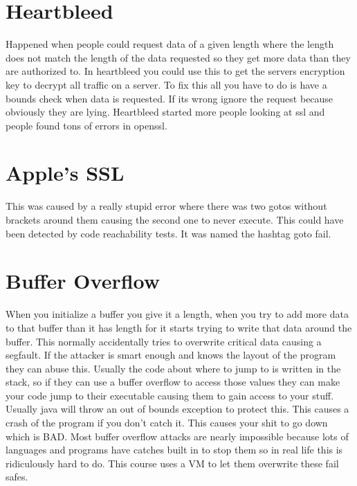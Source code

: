 \documentclass{article}
\begin{document}


\section{Heartbleed} %
\label{sec:heartbleed}
Happened when people could request data of a given length where the length does not match the length of the data requested so they get more data than they are authorized to. In heartbleed you could use this to get the servers encryption key to decrypt all traffic on a server. To fix this all you have to do is have a bounds check when data is requested. If its wrong ignore the request because obviously they are lying. Heartbleed started more people looking at ssl and people found tons of errors in openssl. 


\section{Apple's SSL} %
\label{sec:apple_s_ssl}
This was caused by a really stupid error where there was two gotos without brackets around them causing the second one to never execute. This could have been detected by code reachability tests. It was named the hashtag goto fail. 


\section{Buffer Overflow} %
\label{sec:buffer_overflow}
When you initialize a buffer you give it a length, when you try to add more data to that buffer than it has length for it starts trying to write that data around the buffer. This normally accidentally tries to overwrite critical data causing a segfault. If the attacker is smart enough and knows the layout of the program they can abuse this. Usually the code about where to jump to is written in the stack, so if they can use a buffer overflow to access those values they can make your code jump to their executable causing them to gain access to your stuff. Usually java will throw an out of bounds exception to protect this. This causes a crash of the program if you don't catch it. This causes your shit to go down which is BAD. Most buffer overflow attacks are nearly impossible because lots of languages and programs have catches built in to stop them so in real life this is ridiculously hard to do. This course uses a VM to let them overwrite these fail safes.
\end{document}
